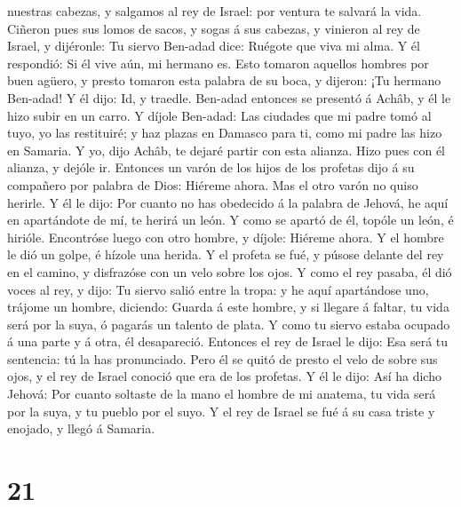 nuestras cabezas, y salgamos al rey de Israel: por ventura te salvará la
vida.  Ciñeron pues sus lomos de sacos, y sogas á sus
cabezas, y vinieron al rey de Israel, y dijéronle: Tu siervo Ben-adad
dice: Ruégote que viva mi alma. Y él respondió: Si él vive aún, mi
hermano es.  Esto tomaron aquellos hombres por buen
agüero, y presto tomaron esta palabra de su boca, y dijeron: ¡Tu hermano
Ben-adad! Y él dijo: Id, y traedle. Ben-adad entonces se presentó á
Achâb, y él le hizo subir en un carro.  Y díjole
Ben-adad: Las ciudades que mi padre tomó al tuyo, yo las restituiré; y
haz plazas en Damasco para ti, como mi padre las hizo en Samaria. Y yo,
dijo Achâb, te dejaré partir con esta alianza. Hizo pues con él alianza,
y dejóle ir.  Entonces un varón de los hijos de los
profetas dijo á su compañero por palabra de Dios: Hiéreme ahora. Mas el
otro varón no quiso herirle.  Y él le dijo: Por cuanto no
has obedecido á la palabra de Jehová, he aquí en apartándote de mí, te
herirá un león. Y como se apartó de él, topóle un león, é hirióle.
 Encontróse luego con otro hombre, y díjole: Hiéreme
ahora. Y el hombre le dió un golpe, é hízole una herida. 
Y el profeta se fué, y púsose delante del rey en el camino, y disfrazóse
con un velo sobre los ojos.  Y como el rey pasaba, él dió
voces al rey, y dijo: Tu siervo salió entre la tropa: y he aquí
apartándose uno, trájome un hombre, diciendo: Guarda á este hombre, y si
llegare á faltar, tu vida será por la suya, ó pagarás un talento de
plata.  Y como tu siervo estaba ocupado á una parte y á
otra, él desapareció. Entonces el rey de Israel le dijo: Esa será tu
sentencia: tú la has pronunciado.  Pero él se quitó de
presto el velo de sobre sus ojos, y el rey de Israel conoció que era de
los profetas.  Y él le dijo: Así ha dicho Jehová: Por
cuanto soltaste de la mano el hombre de mi anatema, tu vida será por la
suya, y tu pueblo por el suyo.  Y el rey de Israel se fué
á su casa triste y enojado, y llegó á Samaria.

\hypertarget{section-20}{%
\section{21}\label{section-20}}

